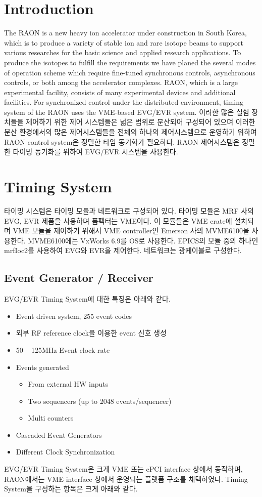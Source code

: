\documentclass[11pt
-  , a4paper
  , article
  , oneside
]{memoir}
\begin{document}
\begin{multicols}{2}
	
	
\chapter{Introduction}
The RAON\cite{TSHOO:NIMB} is a new heavy ion accelerator under construction in South Korea, which is to produce a variety of stable ion and rare isotope beams to support various researches for the basic science and applied research applications. To produce the isotopes to fulfill the requirements we have planed the several modes of operation scheme which require fine-tuned synchronous controls, asynchronous controls, or both among the accelerator complexes. RAON, which is a large experimental facility, consists of many experimental devices and additional facilities. For synchronized control under the distributed environment, timing system of the RAON uses the VME-based EVG/EVR system. 
이러한 많은 실험 장치들을 제어하기 위한 제어 시스템들은 넓은 범위로 분산되어 구성되어 있으며 이러한 분산 환경에서의 많은 제어시스템들을 전체의 하나의 제어시스템으로 운영하기 위하여 RAON control system은 정밀한 타임 동기화가 필요하다. RAON 제어시스템은 정밀한 타이밍 동기화를 위하여 EVG/EVR 시스템을 사용한다. 

\chapter{Timing System}
타이밍 시스템은 타이밍 모듈과 네트워크로 구성되어 있다. 타이밍 모듈은 MRF 사의 EVG, EVR 제품을 사용하며 폼펙터는 VME이다. 이 모듈들은 VME crate에 설치되며 VME 모듈을 제어하기 위해서 VME controller인 Emerson 사의 MVME6100을 사용한다. MVME6100에는 VxWorks 6.9를 OS로 사용한다.
EPICS의 모듈 중의 하나인 mrfIoc2를 사용하여 EVG와 EVR을 제어한다. 네트워크는 광케이블로 구성한다. 
\section{Event Generator / Receiver}
EVG/EVR Timing System에 대한 특징은 아래와 같다.

\begin{itemize}
	\item Event driven system, 255 event codes
	\item 외부 RF reference clock을 이용한 event 신호 생성
	\item 50 ~ 125MHz Event clock rate
	\item Events generated
	\begin{itemize}
		\item From external HW inputs
		\item Two sequencers (up to 2048 events/sequencer)
		\item Multi counters
	\end{itemize}
	\item Cascaded Event Generators
	\item Different Clock Synchronization
\end{itemize}
EVG/EVR Timing System은 크게 VME 또는 cPCI interface 상에서 동작하며, RAON에서는 VME interface 상에서 운영되는 플랫폼 구조를 채택하였다. Timing System을 구성하는 항목은 크게 아래와 같다.



\end{multicols}
\end{document}
